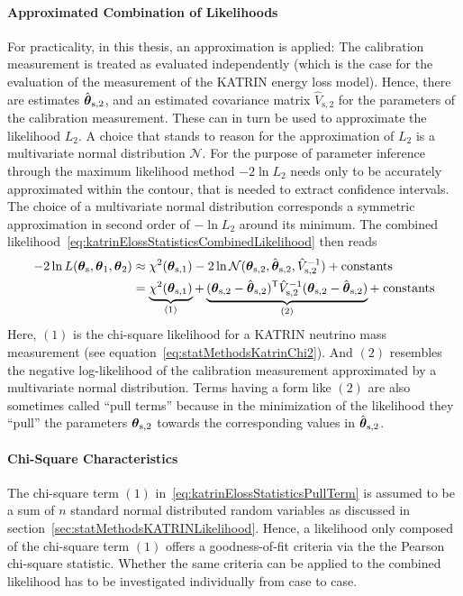 \paragraph{Approximated Combination of Likelihoods}
For practicality, in this thesis, an approximation is applied: The calibration measurement is treated as evaluated independently (which is the case for the evaluation of the measurement of the KATRIN energy loss model). Hence, there are estimates $\hat{\boldsymbol{\mathbf{\theta}}}_\mathrm{s,2}$, and an estimated covariance matrix $\hat{V}_\mathrm{s,2}$ for the parameters of the calibration measurement. These can in turn be used to approximate the likelihood $L_2$. A choice that stands to reason for the approximation of $L_2$ is a multivariate normal distribution $\mathcal{N}$. For the purpose of parameter inference through the maximum likelihood method $-2\ln L_2$ needs only to be accurately approximated within the contour, that is needed to extract confidence intervals. The choice of a multivariate normal distribution corresponds a symmetric approximation in second order of $-\ln L_2$ around its minimum. The combined likelihood~\eqref{eq:katrinElossStatisticsCombinedLikelihood} then reads
\begin{equation}
\begin{split}
\label{eq:katrinElossStatisticsPullTerm}
-2\ln L(\paramVecShared, \paramVec_1, \paramVec_2) &\approx
\chi^2(\paramVecSOne) 
-2\ln \mathcal{N}(\paramVecSTwo, \hat{\paramVec}_\mathrm{s,2}, \hat{V}_\mathrm{s,2}^{-1}) +
\mathrm{ constants}\\ &=
\underbrace{
	\chi^2(\paramVecSOne)
	\vphantom{(\paramVecSTwo - \hat{\paramVec}_\mathrm{s,2})^{\mathsf{T}}}
}_{(1)}
+
\underbrace{
	(\paramVec_\mathrm{s,2} - \hat{\paramVec}_\mathrm{s,2})^{\mathsf{T}}
	\hat{V}_\mathrm{s,2}^{-1}
	(\paramVec_\mathrm{s,2} - \hat{\paramVec}_\mathrm{s,2})
}_{(2)} +\; 
\mathrm{ constants}
\end{split}
\end{equation}
Here, $(1)$ is the chi-square likelihood for a KATRIN neutrino mass measurement (see equation~\ref{eq:statMethodsKatrinChi2}). And $(2)$ resembles the negative log-likelihood of the calibration measurement approximated by a multivariate normal distribution. Terms having a form like $(2)$ are also sometimes called ``pull terms'' because in the minimization of the likelihood they ``pull'' the parameters $\boldsymbol{\mathbf{\theta}}_\mathrm{s,2}$ towards the corresponding values in $\hat{\boldsymbol{\mathbf{\theta}}}_\mathrm{s,2}$.

\paragraph{Chi-Square Characteristics}
The chi-square term $(1)$ in~\eqref{eq:katrinElossStatisticsPullTerm} is assumed to be a sum of $n$ standard normal distributed random variables as discussed in section~\ref{sec:statMethodsKATRINLikelihood}. Hence, a likelihood only composed of the chi-square term $(1)$ offers a goodness-of-fit criteria via the the Pearson chi-square statistic. Whether the same criteria can be applied to the combined likelihood has to be investigated individually from case to case.


